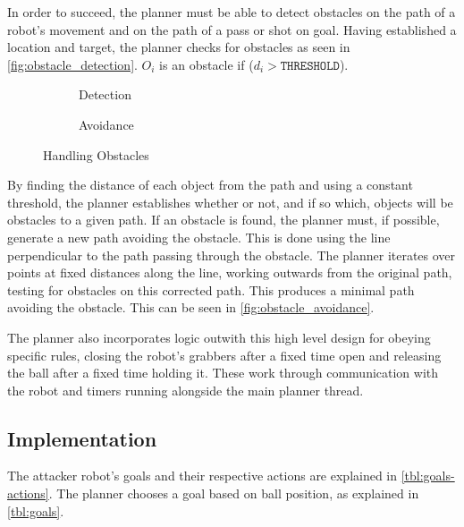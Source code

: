 In order to succeed, the planner must be able to detect obstacles on the path of a robot's movement and on the path of a pass or shot on goal. Having established a location and target, the planner checks for obstacles as seen in \autoref{fig:obstacle_detection}. $O_i$ is an obstacle if ($d_i > \texttt{THRESHOLD}$).

\begin{figure}[H]
\centering
\begin{subfigure}{.5\textwidth}
\centering

\caption{Detection}
\label{fig:obstacle_detection}
\end{subfigure}%
\begin{subfigure}{.5\textwidth}
\centering

\caption{Avoidance}
\label{fig:obstacle_avoidance}
\end{subfigure}
\caption{Handling Obstacles}
\label{handling_obstacle}
\end{figure}

By finding the distance of each object from the path and using a constant threshold, the planner establishes whether or not, and if so which, objects will be obstacles to a given path. If an obstacle is found, the planner must, if possible, generate a new path avoiding the obstacle. This is done using the line perpendicular to the path passing through the obstacle. The planner iterates over points at fixed distances along the line, working outwards from the original path, testing for obstacles on this corrected path. This produces a minimal path avoiding the obstacle. This can be seen in \autoref{fig:obstacle_avoidance}.


The planner also incorporates logic outwith this high level design for obeying specific rules, closing the robot's grabbers after a fixed time open and releasing the ball after a fixed time holding it. These work through communication with the robot and timers running alongside the main planner thread.

\subsection{Implementation}

The attacker robot's goals and their respective actions are explained in \autoref{tbl:goals-actions}.
The planner chooses a goal based on ball position, as explained in \autoref{tbl:goals}.

